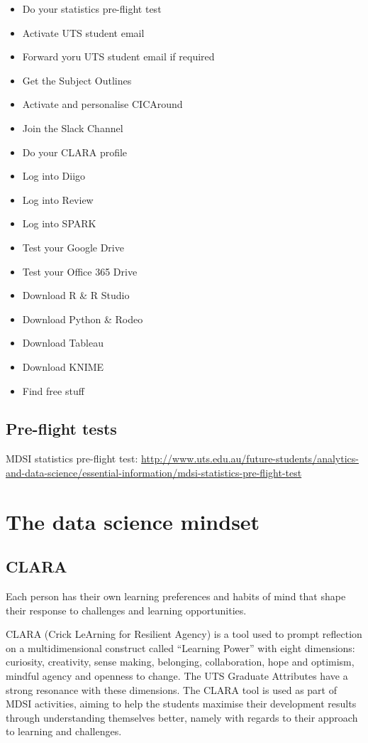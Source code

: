 \documentclass[]{book}
\providecommand{\tightlist}{%
  \setlength{\itemsep}{0pt}\setlength{\parskip}{0pt}}
\theoremstyle{definition}
\theoremstyle{definition}
\theoremstyle{remark}
\begin{document}
\begin{itemize}
\tightlist
\item
  Do your statistics pre-flight test
\item
  Activate UTS student email
\item
  Forward yoru UTS student email if required
\item
  Get the Subject Outlines
\item
  Activate and personalise CICAround
\item
  Join the Slack Channel
\item
  Do your CLARA profile
\item
  Log into Diigo
\item
  Log into Review
\item
  Log into SPARK
\item
  Test your Google Drive
\item
  Test your Office 365 Drive
\item
  Download R \& R Studio
\item
  Download Python \& Rodeo
\item
  Download Tableau
\item
  Download KNIME
\item
  Find free stuff
\end{itemize}

\section{Pre-flight tests}\label{pre-flight-tests}

MDSI statistics pre-flight test:
\url{http://www.uts.edu.au/future-students/analytics-and-data-science/essential-information/mdsi-statistics-pre-flight-test}

\chapter{The data science mindset}\label{the-data-science-mindset}

\section{CLARA}\label{clara}

Each person has their own learning preferences and habits of mind that
shape their response to challenges and learning opportunities.

CLARA (Crick LeArning for Resilient Agency) is a tool used to prompt
reflection on a multidimensional construct called ``Learning Power''
with eight dimensions: curiosity, creativity, sense making, belonging,
collaboration, hope and optimism, mindful agency and openness to change.
The UTS Graduate Attributes have a strong resonance with these
dimensions. The CLARA tool is used as part of MDSI activities, aiming to
help the students maximise their development results through
understanding themselves better, namely with regards to their approach
to learning and challenges.
\end{document}
